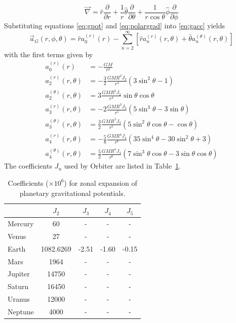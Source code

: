 \documentclass[a4paper]{article}
\begin{document}
\begin{equation}\label{eq:polargrad}
\vec{\nabla} = \hat{r} \frac{\partial}{\partial r} + \frac{1}{r} \hat{\theta}\frac{\partial}{\partial \theta} + \frac{1}{r \cos\theta}\hat{\phi}\frac{\partial}{\partial\phi}
\end{equation}
Substituting equations \ref{eq:gpot} and \ref{eq:polargrad} into \ref{eq:gacc} yields
\begin{equation}
\vec{a}_G(r,\phi,\theta) = \hat{r} a_0^{(r)}(r) - \sum_{n=2}^\infty \left[ \hat{r} a_n^{(r)}(r,\theta) + \hat{\theta} a_n^{(\theta)}(r,\theta) \right]
\end{equation}
with the first terms given by
\begin{equation}
\begin{split}
a_0^{(r)}(r) &= -\frac{GM}{r^2} \\
a_2^{(r)}(r,\theta) &= -\frac{3}{2} \frac{GMR^2 J_2}{r^4}(3\sin^2\theta - 1)\\
a_2^{(\theta)}(r,\theta) &= 3 \frac{GMR^2 J_2}{r^4} \sin\theta \cos\theta \\
a_3^{(r)}(r,\theta) &= -2 \frac{GMR^3 J_3}{r^5}(5 \sin^3\theta - 3\sin\theta)\\
a_3^{(\theta)}(r,\theta) &= \frac{3}{2} \frac{GMR^3 J_3}{r^5} (5 \sin^2\theta \cos\theta - \cos\theta) \\
a_4^{(r)}(r,\theta) &= -\frac{5}{8} \frac{GMR^4 J_4}{r^6}(35 \sin^4\theta - 30\sin^2\theta + 3) \\
a_4^{(\theta)}(r,\theta) &= \frac{5}{2} \frac{GMR^4 J_4}{r^6} (7 \sin^3\theta \cos\theta - 3 \sin\theta \cos\theta)
\end{split}
\end{equation}
The coefficients $J_n$ used by Orbiter are listed in Table~\ref{tab:Jn}.
\begin{table}
\begin{tabular}{lcccc}
        & $J_2$     & $J_3$ & $J_4$ & $J_5$ \\ \hline
Mercury & 60        & -     & -     & -     \\
Venus   & 27        & -     & -     & -     \\ 
Earth   & 1082.6269 & -2.51 & -1.60 & -0.15 \\
Mars    & 1964      & -     & -     & -     \\
Jupiter & 14750     & -     & -     & -     \\
Saturn  & 16450     & -     & -     & -     \\
Uranus  & 12000     & -     & -     & -     \\
Neptune & 4000      & -     & -     & -
\end{tabular}
\caption{Coefficients ($\times 10^6$) for zonal expansion of planetary gravitational potentials.}
\label{tab:Jn}
\end{table}
\end{document}
